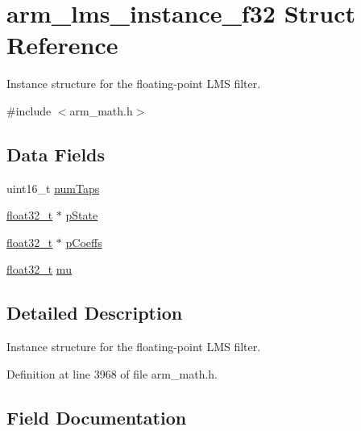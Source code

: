 \hypertarget{structarm__lms__instance__f32}{}\section{arm\+\_\+lms\+\_\+instance\+\_\+f32 Struct Reference}
\label{structarm__lms__instance__f32}


Instance structure for the floating-\/point L\+MS filter.  




{\ttfamily \#include $<$arm\+\_\+math.\+h$>$}

\subsection*{Data Fields}
\begin{DoxyCompactItemize}
\item 
uint16\+\_\+t \hyperlink{structarm__lms__instance__f32_a751941891e47f522a7f5375fe8990aac}{num\+Taps}
\item 
\hyperlink{arm__math_8h_a4611b605e45ab401f02cab15c5e38715}{float32\+\_\+t} $\ast$ \hyperlink{structarm__lms__instance__f32_a335c87e6fdc4b96601d95a5de8b9c463}{p\+State}
\item 
\hyperlink{arm__math_8h_a4611b605e45ab401f02cab15c5e38715}{float32\+\_\+t} $\ast$ \hyperlink{structarm__lms__instance__f32_aacbb8dd8eeba4b21fc2bb40076405ee3}{p\+Coeffs}
\item 
\hyperlink{arm__math_8h_a4611b605e45ab401f02cab15c5e38715}{float32\+\_\+t} \hyperlink{structarm__lms__instance__f32_a11402afa7c9b9dac4cb953fa386e74d2}{mu}
\end{DoxyCompactItemize}


\subsection{Detailed Description}
Instance structure for the floating-\/point L\+MS filter. 

Definition at line 3968 of file arm\+\_\+math.\+h.



\subsection{Field Documentation}
